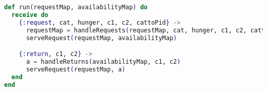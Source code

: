 \begin{lstlisting}[language=Elixir, title=How message handling is implemented]
def run(requestMap, availabilityMap) do
  receive do
    {:request, cat, hunger, c1, c2, cattoPid} ->
      requestMap = handleRequests(requestMap, cat, hunger, c1, c2, cattoPid)
      serveRequest(requestMap, availabilityMap)

    {:return, c1, c2} ->
      a = handleReturns(availabilityMap, c1, c2)
      serveRequest(requestMap, a)
  end
end
\end{lstlisting}